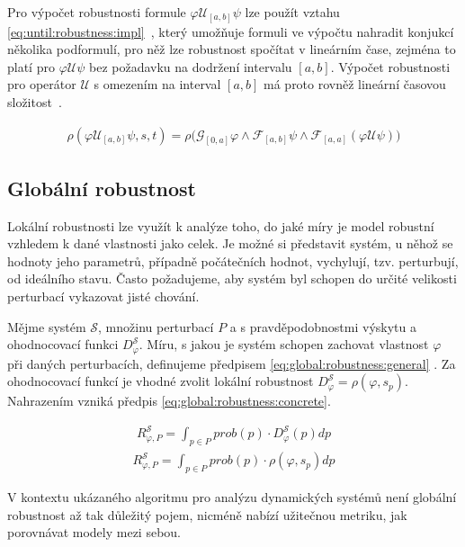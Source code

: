 Pro výpočet robustnosti formule $\varphi\mathcal{U}_{[a,b]}\psi$ lze použít vztahu \ref{eq:until:robustness:impl}~\cite{donze2010},
který umožňuje formuli ve výpočtu nahradit konjukcí několika podformulí, pro něž lze robustnost spočítat v lineárním čase, zejména 
to platí pro $\varphi\mathcal{U}\psi$ bez požadavku na dodržení intervalu $[a,b]$. Výpočet robustnosti pro operátor $\mathcal{U}$
s omezením na interval $[a,b]$ má proto rovněž lineární časovou složitost~\cite{donze2010}.

\begin{align}\label{eq:until:robustness:impl}
\rho(\varphi\mathcal{U}_{[a,b]}\psi, s, t) = \rho\Big(\mathcal{G}_{[0, a]}\varphi \wedge \mathcal{F}_{[a,b]}\psi \wedge \mathcal{F}_{[a,a]}(\varphi\mathcal{U}\psi)\Big)
\end{align}

\subsection{Globální robustnost}

Lokální robustnosti lze využít k analýze toho, do jaké míry je model robustní vzhledem
k dané vlastnosti jako celek. Je možné si představit systém, u něhož se hodnoty jeho parametrů, případně počátečních
hodnot, vychylují, tzv. perturbují, od ideálního stavu. Často požadujeme, aby systém byl schopen do určité velikosti
perturbací vykazovat jisté chování.

Mějme systém $\mathcal{S}$, množinu perturbací $P$ a s pravděpodobnostmi výskytu a ohodnocovací funkci $D_\varphi^\mathcal{S}$.
Míru, s jakou je systém schopen zachovat vlastnost $\varphi$ při daných perturbacích,
definujeme předpisem \ref{eq:global:robustness:general} \cite{kitano2007}. Za ohodnocovací funkcí je vhodné zvolit lokální
robustnost $D_\varphi^\mathcal{S} = \rho(\varphi, s_p)$. Nahrazením vzniká předpis \ref{eq:global:robustness:concrete}.

\begin{align}
R_{\varphi, P}^\mathcal{S} = {\displaystyle\int_{p \in P}}prob(p) \cdot D_\varphi^\mathcal{S}(p)dp\label{eq:global:robustness:general}
\end{align}
\begin{align}
R_{\varphi, P}^\mathcal{S} = {\displaystyle\int_{p \in P}}prob(p) \cdot \rho(\varphi, s_p)dp\label{eq:global:robustness:concrete}
\end{align}

V kontextu ukázaného algoritmu pro analýzu dynamických systémů není globální robustnost až tak
důležitý pojem, nicméně nabízí užitečnou metriku, jak porovnávat modely mezi sebou.

